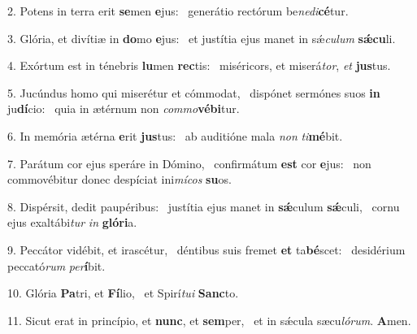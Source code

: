 2. Potens in terra erit \textbf{se}men \textbf{e}jus: \ast\  generátio rectórum be\textit{ne}\textit{di}\textbf{cé}tur.\

3. Glória, et divítiæ in \textbf{do}mo \textbf{e}jus: \ast\  et justítia ejus manet in sǽ\textit{cu}\textit{lum} \textbf{sǽ}\textbf{cu}li.\

4. Exórtum est in ténebris \textbf{lu}men \textbf{rec}tis: \ast\  miséricors, et miserá\textit{tor}, \textit{et} \textbf{jus}tus.\

5. Jucúndus homo qui miserétur et cómmodat, \dag\  dispónet sermónes suos \textbf{in} ju\textbf{dí}cio: \ast\  quia in ætérnum non \textit{com}\textit{mo}\textbf{vé}\textbf{bi}tur.\

6. In memória ætérna \textbf{e}rit \textbf{jus}tus: \ast\  ab auditióne mala \textit{non} \textit{ti}\textbf{mé}bit.\

7. Parátum cor ejus speráre in Dómino, \dag\  confirmátum \textbf{est} cor \textbf{e}jus: \ast\  non commovébitur donec despíciat ini\textit{mí}\textit{cos} \textbf{su}os.\

8. Dispérsit, dedit paupéribus: \dag\  justítia ejus manet in \textbf{sǽ}culum \textbf{sǽ}culi, \ast\  cornu ejus exaltábi\textit{tur} \textit{in} \textbf{gló}\textbf{ri}a.\

9. Peccátor vidébit, et irascétur, \dag\  déntibus suis fremet \textbf{et} ta\textbf{bé}scet: \ast\  desidérium peccató\textit{rum} \textit{per}\textbf{í}bit.\

10. Glória \textbf{Pa}tri, et \textbf{Fí}lio, \ast\  et Spirí\textit{tu}\textit{i} \textbf{Sanc}to.\

11. Sicut erat in princípio, et \textbf{nunc}, et \textbf{sem}per, \ast\  et in sǽcula sæcu\textit{ló}\textit{rum}. \textbf{A}men.\

